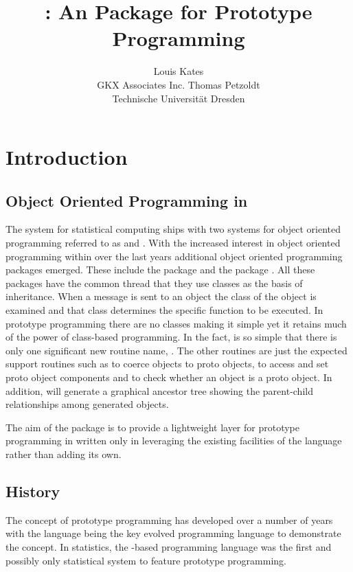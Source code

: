 \documentclass{Z}
\author{Louis Kates\\GKX Associates Inc. \And
        Thomas Petzoldt\\Technische Universit\"at Dresden}
\title{\pkg{proto}: An \proglang{R} Package for Prototype Programming}
\begin{document}
\section{Introduction} \label{sec:intro}

\subsection[Object Oriented Programming in R]{Object Oriented Programming in }
\label{sec:oo}

The  system for statistical computing
\citep[\url{http://www.R-project.org/}]{Rcore2005} ships with two
systems for object oriented programming referred to as 
and .  With the increased interest in object oriented
programming within  over the last years additional object
oriented programming packages emerged.  These include the 
package \citep{Bengtsson2003} and the  package
\citep[\url{http://www.omegahat.org/OOP/}]{Rnews:Chambers+Lang:2001a}.
All these packages have the common thread that they use
classes as the basis of inheritance.  When a message is sent to an
object the class of the object is examined and that class determines the
specific function to be executed. In prototype programming there
are no classes making it simple yet it retains much of the power of
class-based programming.  In the fact,  is so simple that
there is only one significant new routine name, .  The
other routines are just the expected support routines such as
 to coerce objects to proto objects, \code{\$} to
access and set proto object components and  to check
whether an object is a proto object.  In addition, 
will generate a graphical ancestor tree showing the parent-child
relationships among generated  objects.

The aim of the package is to provide a lightweight layer for prototype
programming in  written only in  leveraging the
existing facilities of the language rather than adding its own.

\subsection{History}
\label{sec:history}

The concept of 
prototype programming
\citep{Lieberman1986, Taivalsaari1996a, Noble1999}
has developed over a number of years with the 
language \citep{Agesen1992}
being the key evolved programming language to demonstrate
the concept.  In statistics, the -based
 programming language \citep{Tierney1990} was
the first and possibly only statistical system to feature prototype 
programming.
\end{document}
